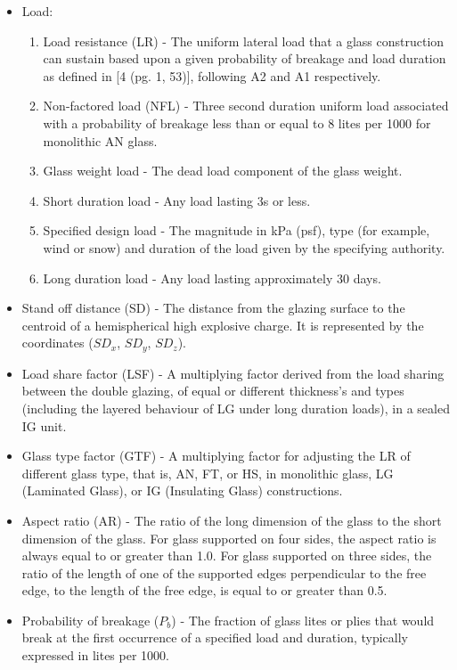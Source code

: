 \documentclass[12pt]{article}
\begin{document}
\begin{itemize}
\begin{enumerate}
\end{enumerate}
\item{Load:}
\begin{enumerate}
\item{Load resistance (LR) - The uniform lateral load that a glass construction can sustain based upon a given probability of breakage and load duration as defined in [4 (pg. 1, 53)], following A2 and A1 respectively.}
\item{Non-factored load (NFL) - Three second duration uniform load associated with a probability of breakage less than or equal to 8 lites per 1000 for monolithic AN glass.}
\item{Glass weight load - The dead load component of the glass weight.}
\item{Short duration load - Any load lasting 3s or less.}
\item{Specified design load - The magnitude in kPa (psf), type (for example, wind or snow) and duration of the load given by the specifying authority.}
\item{Long duration load - Any load lasting approximately 30 days.}
\end{enumerate}
\item{Stand off distance (SD) - The distance from the glazing surface to the centroid of a hemispherical high explosive charge. It is represented by the coordinates (${SD_{x}}$, ${SD_{y}}$, ${SD_{z}}$).}
\item{Load share factor (LSF) - A multiplying factor derived from the load sharing between the double glazing, of equal or different thickness's and types (including the layered behaviour of LG under long duration loads), in a sealed IG unit.}
\item{Glass type factor (GTF) - A multiplying factor for adjusting the LR of different glass type, that is, AN, FT, or HS, in monolithic glass, LG (Laminated Glass), or IG (Insulating Glass) constructions.}
\item{Aspect ratio (AR) - The ratio of the long dimension of the glass to the short dimension of the glass. For glass supported on four sides, the aspect ratio is always equal to or greater than 1.0. For glass supported on three sides, the ratio of the length of one of the supported edges perpendicular to the free edge, to the length of the free edge, is equal to or greater than 0.5.}
\item{Probability of breakage (${P_{b}}$) - The fraction of glass lites or plies that would break at the first occurrence of a specified load and duration, typically expressed in lites per 1000.}
\end{itemize}
\end{document}
